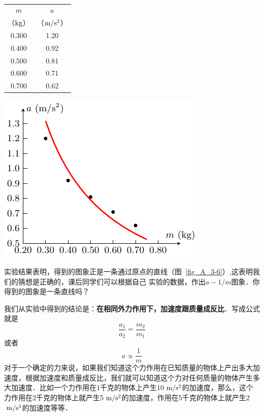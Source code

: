 \begin{table}[htbp]
	\centering
	\begin{minipage}[b]{0.45\linewidth}
		\centering
		\begin{tabular}{cc}
			\hline
			$m$  & $a$ \\
			（$\text{kg}$）&（$\text{m}/\text{s}^2$）\\
			\hline
			0.300  &  1.20  \\
			0.400  &  0.92  \\
			0.500  &  0.81  \\
			0.600  &  0.71  \\
			0.700  &  0.62  \\
			\hline
		\end{tabular}
		\caption{}\label{tab_A_3-2}
	\end{minipage}
	\hfil
	\begin{minipage}[b]{0.45\linewidth}
		\centering
		\includegraphics{fig/A/3-5.pdf}
		\label{fig_A_3-5}
	\end{minipage}
\end{table}




实验结果表明，得到的图象正是一条通过原点的直线（图~\ref{fig_A_3-6}）,这表明我们的猜想是正确的，课后同学们可以根据自己
实验的数据，作出$a-1/m$图象．你得到的图象是一条直线吗？


我们从实验中得到的结论是：\textbf{在相同外力作用下，加速度跟质量成反比}．写成公式就是
\[\frac{a_1}{a_2}=\frac{m_2}{m_1} \]
或者
\[a\propto \frac{1}{m} \]
对于一个确定的力来说，如果我们知道这个力作用在已知质量的物体上产出多大加速度，根据加速度和质量成反比，我们就可以知道这个力对任何质量的物体产生多大加速度．比如一个力作用在1千克的物体上产生10$\;\text{m}/\text{s}^2$的加速度，那么，这个力作用在2千克的物体上就产生5$\;\text{m}/\text{s}^2$的加速度，作用在5千克的物体上就产生2$\;\text{m}/\text{s}^2$的加速度等等．




